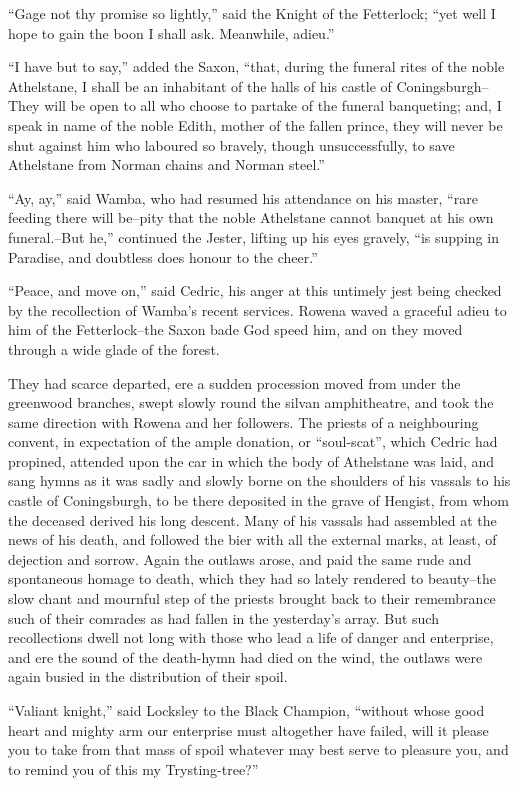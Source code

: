 ``Gage not thy promise so lightly,'' said the Knight of the Fetterlock;
``yet well I hope to gain the boon I shall ask. Meanwhile, adieu.''

``I have but to say,'' added the Saxon, ``that, during the funeral rites
of the noble Athelstane, I shall be an inhabitant of the halls of his
castle of Coningsburgh--They will be open to all who choose to partake
of the funeral banqueting; and, I speak in name of the noble Edith,
mother of the fallen prince, they will never be shut against him who
laboured so bravely, though unsuccessfully, to save Athelstane from
Norman chains and Norman steel.''

``Ay, ay,'' said Wamba, who had resumed his attendance on his master,
``rare feeding there will be--pity that the noble Athelstane cannot
banquet at his own funeral.--But he,'' continued the Jester, lifting up
his eyes gravely, ``is supping in Paradise, and doubtless does honour to
the cheer.''

``Peace, and move on,'' said Cedric, his anger at this untimely jest
being checked by the recollection of Wamba's recent services. Rowena
waved a graceful adieu to him of the Fetterlock--the Saxon bade God
speed him, and on they moved through a wide glade of the forest.

They had scarce departed, ere a sudden procession moved from under the
greenwood branches, swept slowly round the silvan amphitheatre, and took
the same direction with Rowena and her followers. The priests of a
neighbouring convent, in expectation of the ample donation, or
``soul-scat'', which Cedric had propined, attended upon the car in which
the body of Athelstane was laid, and sang hymns as it was sadly and
slowly borne on the shoulders of his vassals to his castle of
Coningsburgh, to be there deposited in the grave of Hengist, from whom
the deceased derived his long descent. Many of his vassals had assembled
at the news of his death, and followed the bier with all the external
marks, at least, of dejection and sorrow. Again the outlaws arose, and
paid the same rude and spontaneous homage to death, which they had so
lately rendered to beauty--the slow chant and mournful step of the
priests brought back to their remembrance such of their comrades as had
fallen in the yesterday's array. But such recollections dwell not long
with those who lead a life of danger and enterprise, and ere the sound
of the death-hymn had died on the wind, the outlaws were again busied in
the distribution of their spoil.

``Valiant knight,'' said Locksley to the Black Champion, ``without whose
good heart and mighty arm our enterprise must altogether have failed,
will it please you to take from that mass of spoil whatever may best
serve to pleasure you, and to remind you of this my Trysting-tree?''

